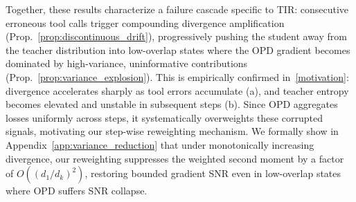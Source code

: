 Together, these results characterize a failure cascade specific to TIR: consecutive erroneous tool calls trigger compounding divergence amplification (Prop.~\ref{prop:discontinuous_drift}), progressively pushing the student away from the teacher distribution into low-overlap states where the OPD gradient becomes dominated by high-variance, uninformative contributions (Prop.~\ref{prop:variance_explosion}). This is empirically confirmed in~\cref{motivation}: divergence accelerates sharply as tool errors accumulate (a), and teacher entropy becomes elevated and unstable in subsequent steps (b). Since OPD aggregates losses uniformly across steps, it systematically overweights these corrupted signals, motivating our step-wise reweighting mechanism.
We formally show in Appendix~\ref{app:variance_reduction} that under monotonically increasing divergence, our reweighting suppresses the weighted second moment by a factor of $O((d_1/d_k)^2)$, restoring bounded gradient SNR even in low-overlap states where OPD suffers SNR collapse.
